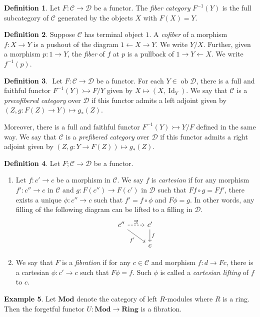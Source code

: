\documentclass[10pt,letterpaper,cm]{nupset}
\theoremstyle{definition}
\newtheorem{definition}{Definition}
\newtheorem{exmp}[definition]{Example}
\theoremstyle{theorem}
\theoremstyle{remark}
\newcommand{\1}{\mathbf{1}}
\renewcommand{\c}{\mathscr{C}}
\renewcommand{\d}{\mathscr{D}}
\newcommand{\0}{\vec 0}
\DeclareMathOperator{\id}{Id}
\DeclareMathOperator{\ob}{ob}
\begin{document}
\begin{definition}
Let $F : \c \to \d$ be a functor. The \textit{fiber category} $F^{-1}(Y)$ is the full subcategory of $\c$ generated by the objects $X$ with $F(X) =Y$.
\end{definition}

\begin{definition}
Suppose $\c$ has terminal object $1$. A \textit{cofiber} of a morphism $f: X \to Y$ is a pushout of the diagram $1 \leftarrow X \rightarrow Y$. We write $Y/X$. Further, given a morphism $p: 1 \to Y$, the \textit{fiber} of $f$ at $p$ is a pullback of $1 \rightarrow Y \leftarrow X$. We write $f^{-1}(p)$.
\end{definition}

\begin{definition} $ $
Let $F : \c \to \d$ be a functor. For each $Y \in \ob \d$, there is a full and faithful functor $F^{-1}(Y)  \rightarrowtail F/Y$ given by $X \mapsto (X, \id_Y)$. We say that $\c$ is a \textit{precofibered category} over $\d$ if this functor admits a left adjoint given by $(Z, g: F(Z) \to Y) \mapsto g_{\ast}(Z)$.
\end{definition}

Moreover, there is a full and faithful functor $F^{-1}(Y) \rightarrowtail Y/F$ defined in the same way. We say that $\c$ is a \textit{prefibered category} over $\d$ if this functor admits a right adjoint given by $(Z, g: Y \to F(Z)) \mapsto g_{\ast}(Z)$.

\begin{definition}  Let $F ; \c \to \d$ be a functor.
\begin{enumerate}
\item Let $f: c' \to c$ be a morphism in $\c$. We say $f$ is \textit{cartesian} if for any morphism $f' : c'' \to c$ in $\c$ and $g : F(c'') \to F(c')$ in $\d$ such that $Ff \circ g = Ff'$, there exists a unique $\phi : c'' \to c$ such that $f' = f \circ \phi$ and $F\phi = g$. In other words, any filling of the following diagram can be lifted to a filling in $\d$.
\[ \begin{tikzcd}
c'' \arrow[r, dashed, "\exists!"] \arrow[swap, dr,  " f' "] & c' \arrow[d, "f"] \\%
 & c
\end{tikzcd}
\]
\item We say that $F$ is a \textit{fibration} if for any $c \in \c$ and morphism $f: d \to Fc$, there is a cartesian $\phi : c' \to c$ such that $F\phi =f$. Such $\phi$ is called a \textit{cartesian lifting} of $f$ to $c$.
\end{enumerate}
\end{definition}


\begin{exmp}
Let $\mathbf{Mod}$ denote the category of left $R$-modules where $R$ is a ring. Then the forgetful functor $U: \mathbf{Mod} \to \mathbf{Ring}$ is a fibration.
\end{exmp}
\end{document}
